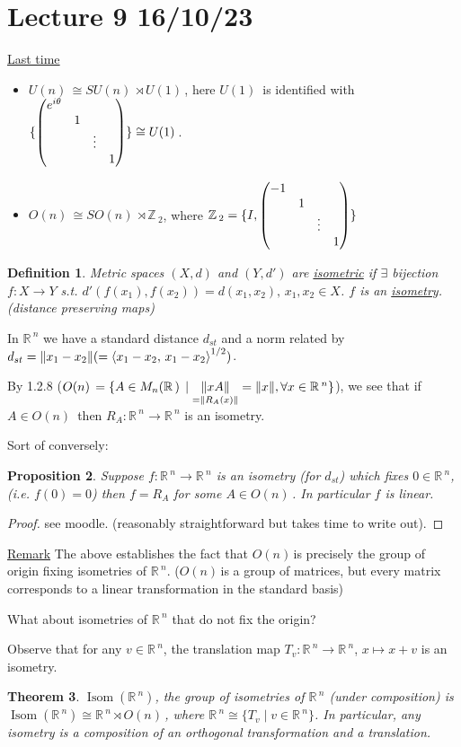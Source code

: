 \documentclass[12pt,a4paper]{article}
\newcommand{\zZ}{\ensuremath{\mathbb{Z}\,}}
\newcommand{\rR}{\ensuremath{\mathbb{R}\,}}
\newcommand{\mnr}{\ensuremath{M_n(\rR)\,}}
\newcommand{\gon}{\ensuremath{O(n)\,}}
\newcommand{\gun}{\ensuremath{U(n)\,}}
\newcommand{\guk}[1]{\ensuremath{U(#1)\,}}
\newcommand{\gson}{\ensuremath{SO(n)\,}}
\newcommand{\gsun}{\ensuremath{SU(n)\,}}
\newcommand{\ipm}[2]{\ensuremath{\left\langle #1, \, #2 \right\rangle}}
\newcommand{\ul}[1]{\underline{#1}}
\newcommand{\isom}[1]{\ensuremath{\operatorname{Isom}(#1)}}
\newtheorem{thm}{Theorem}[subsubsection]
\newtheorem{defn}[thm]{Definition}
\newtheorem{prop}[thm]{Proposition}
\begin{document}
\section{Lecture 9 16/10/23}
\ul{Last time}
\begin{itemize}
\item $\gun \cong \gsun \rtimes \guk{1}$, here \guk{1} is identified with $\{\pmqty{\dmat{e^{i\theta},1,\vdots,1}}\}\cong \guk{1}$.
\item $\gon \cong \gson \rtimes \zZ_2$, where $\zZ_2 = \{I,\pmqty{\dmat{-1,1,\vdots,1}} \}$
\end{itemize}

\begin{defn}
Metric spaces $(X,d)$ and $(Y,d')$ are \ul{isometric} if $\exists$ bijection $f:X\to Y$ s.t. $d'(f(x_1),f(x_2))=d(x_1,x_2), \, x_1, x_2 \in X$. $f$ is an \ul{isometry}. (distance preserving maps) 
\end{defn}

In $\rR^n$ we have a standard distance $d_{st}$ and a norm related by $d_{st}=\norm{x_1-x_2}(=\ipm{x_1-x_2}{x_1-x_2}^{1/2})$.

By 1.2.8 ($\gon=\{A\in \mnr \mid \underset{=\norm{R_A(x)}}{\norm{xA}}=\norm{x}, \forall x \in \rR^n\}$), we see that if $A\in \gon$ then $R_A:\rR^n\to\rR^n$ is an isometry.

Sort of conversely:

\begin{prop}
Suppose $f:\rR^n\to \rR^n$ is an isometry (for $d_{st}$) which fixes $0\in \rR^n$, (i.e. $f(0)=0$) then $f=R_A$ for some $A\in \gon$. In particular $f$ is linear.
\end{prop}

\begin{proof}
see moodle. (reasonably straightforward but takes time to write out).
\end{proof}

\ul{Remark} The above establishes the fact that \gon is precisely the group of origin fixing isometries of $\rR^n$. (\gon is a group of matrices, but every matrix corresponds to a linear transformation in the standard basis)

What about isometries of $\rR^n$ that do not fix the origin?

Observe that for any $v\in \rR^n$, the translation map $T_v:\rR^n\to\rR^n$, $x\mapsto x+v$ is an isometry.

\begin{thm}
$\isom{\rR^n}$, the group of isometries of $\rR^n$ (under composition) is $\isom{\rR^n}\cong \rR^n \rtimes \gon$, where $\rR^n \cong \{T_v \mid v\in \rR^n\}$. In particular, any isometry is a composition of an orthogonal transformation and a translation.
\end{thm}
\end{document}

